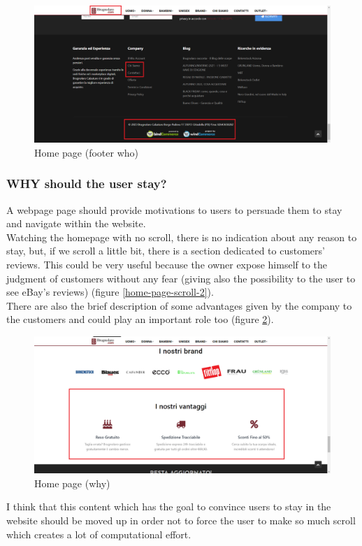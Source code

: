 \begin{figure}[!h] 
    \centering 
    \includegraphics[scale = 0.29]{images/hp_scroll3_circle.png} 
    \caption{Home page (footer who)}
    \label{home-page-scroll-3-circle}
\end{figure}

\subsubsection{WHY should the user stay?}
A webpage page should provide motivations to users to persuade them to stay and navigate within
the website.\\

Watching the homepage with no scroll, there is no indication about any reason to stay, but, if we scroll a little bit,
there is a section dedicated to customers' reviews. This could be very useful because the owner
expose himself to the judgment of customers without any fear (giving also the possibility to
the user to see eBay's reviews) (figure \ref{home-page-scroll-2}).\\
There are also the brief description of some advantages given by the company to the customers
and could play an important role too (figure \ref{home-page-why}).
\begin{figure}[!h] 
    \centering 
    \includegraphics[scale = 0.29]{images/why.png} 
    \caption{Home page (why)}
    \label{home-page-why}
\end{figure}
\newline
I think that this content which has the goal to convince users to stay in the website should be
moved up in order not to force the user to make so much scroll which creates a lot of computational effort.

